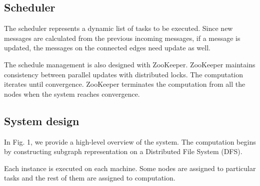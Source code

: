 \subsection{Scheduler}
The scheduler represents a dynamic list of tasks to be executed. Since new messages are calculated from the previous incoming messages, if a message is updated, the messages on the connected edges need update as well. 

The schedule management is also designed with ZooKeeper. ZooKeeper maintains consistency between parallel updates with distributed locks. 
The computation iterates until convergence. ZooKeeper terminates the computation from all the nodes when the system reaches convergence. 


\subsection{System design}
In Fig. 1, we provide a high-level overview of the system. 
The computation begins by constructing subgraph representation on a Distributed File System (DFS). 

Each instance is executed on each machine. 
Some nodes are assigned to particular tasks and the rest of them are assigned to computation. 
